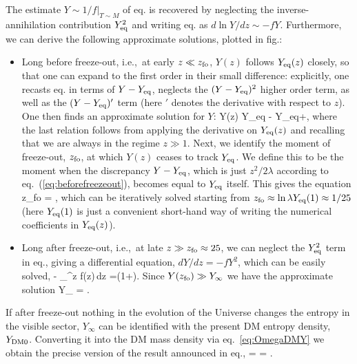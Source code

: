 The estimate $\left.Y \sim 1/f \right|_{T \sim M}$ of eq. is recovered by neglecting the inverse-annihilation
contribution $Y_{\rm eq}^2$ and writing eq. as
$d\ln Y/dz\sim - f Y$.
Furthermore,
we can derive the following approximate solutions, plotted in fig.:
\begin{itemize}
\item[$\lhd$] Long before freeze-out, i.e.,\ at early
$z\ll z_{\rm fo}$, $Y(z)$ follows $Y_{\rm eq}(z)$ closely, so that one can expand to the first order in their small difference: explicitly, one recasts eq. in 
terms of $Y-Y_{\rm eq}$, neglects the $(Y-Y_{\rm eq})^2$ higher order term,  as well as the $(Y-Y_{\rm eq})'$ term  (here $'$ denotes the derivative with respect to $z$). One then finds an approximate solution for $Y$:
\beq 
Y(z)   Y_{\rm eq}  -  
Y_{\rm eq}+,
\label{eq:beforefreezeout}
\eeq
where the last relation follows from applying the derivative on $Y_{\rm eq}(z)$ and recalling that we are always in the regime $z \gg 1$.
Next, we identify the moment of freeze-out, $z_{\rm fo}$, at which $Y(z)$ ceases to track $Y_{\rm eq}$. We define this to be the moment when the discrepancy $Y-Y_{\rm eq}$, which is just $z^2/2\lambda$ according to eq.~(\ref{eq:beforefreezeout}), becomes equal to $Y_{\rm eq}$ itself.
This gives the equation
\beq
z_{\rm fo} = \ln {},
\eeq   
which can be iteratively solved starting from $z_{\rm fo} \approx \ln \lambda Y_{\rm eq}(1) \approx 1/25$ (here $Y_{\rm eq}(1)$ is just a convenient short-hand way of writing the numerical coefficients in $Y_{\rm eq}(z)$).

\item[$\rhd$] Long after freeze-out, i.e.,\ at late
$z\gg z_{\rm fo} \approx 25$,
we can neglect the $Y_{\rm eq}^2$ term in eq., giving a differential equation, $dY/dz = -f Y^2$,  which can be easily solved,
\beq  {}-   \int_\infty^z f(z)\,dz
=\Big(1+\Big).\label{eq:afterfreezeout}
\eeq
Since $Y(z_{\rm fo})\gg Y_\infty$ we have the approximate solution  
\beq Y_{\infty}
=  .\label{eq:Yoo}
\eeq
\end{itemize}
If after freeze-out nothing in the evolution of the Universe changes the entropy in the visible sector, $Y_\infty$ can be identified with the present
DM entropy density, $Y_{\rm DM 0}$.
Converting it into the DM mass density via eq.~\eqref{eq:OmegaDMY} 
we obtain the precise version of the result announced in eq.,
\beq \label{eq:Omegasigma0}
  =
   =
  .\eeq


